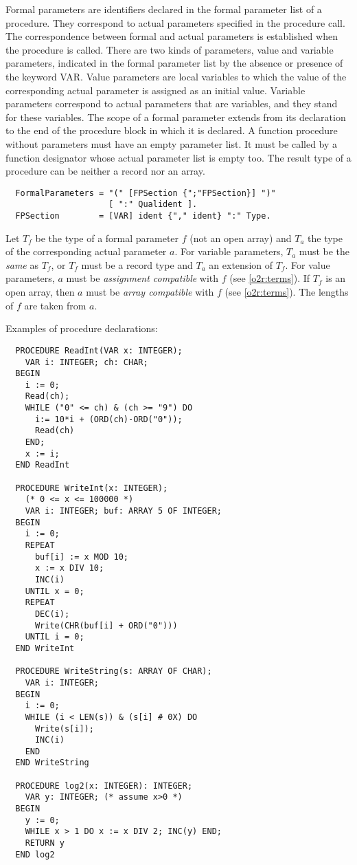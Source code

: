 Formal parameters are identifiers declared in the formal parameter
list of a procedure. They correspond to actual parameters specified
in the procedure call. The correspondence between formal and actual
parameters is established when the procedure is called. There are
two kinds of parameters, value and variable parameters, indicated
in the formal parameter list by the absence or presence of the keyword
VAR. Value parameters are local variables to which the value of the
corresponding actual parameter is assigned as an initial value. Variable
parameters correspond to actual parameters that are variables, and
they stand for these variables. The scope of a formal parameter extends
from its declaration to the end of the procedure block in which it
is declared. A function procedure without parameters must have an
empty parameter list. It must be called by a function designator whose
actual parameter list is empty too. The result type of a procedure
can be neither a record nor an array.
{\BNFsize
\begin{verbatim}
  FormalParameters = "(" [FPSection {";"FPSection}] ")"
                     [ ":" Qualident ].
  FPSection        = [VAR] ident {"," ident} ":" Type.
\end{verbatim}}
Let $T_f$ be the type of a formal parameter $f$ (not an open array) and
$T_a$ the type of the corresponding actual parameter $a$. For variable
parameters, $T_a$ must be the {\em same} as $T_f$,
or $T_f$ must be a record type
and $T_a$ an extension of $T_f$. For value parameters, $a$ must be
{\em assignment compatible} with $f$ (see \ref{o2r:terms}).
If $T_f$ is an open array, then $a$ must be {\em array compatible} with $f$
(see \ref{o2r:terms}). The lengths of $f$ are taken from $a$.

\noindent
Examples of procedure declarations:
\begin{verbatim}
  PROCEDURE ReadInt(VAR x: INTEGER);
    VAR i: INTEGER; ch: CHAR;
  BEGIN
    i := 0;
    Read(ch);
    WHILE ("0" <= ch) & (ch >= "9") DO
      i:= 10*i + (ORD(ch)-ORD("0"));
      Read(ch)
    END;
    x := i;
  END ReadInt

  PROCEDURE WriteInt(x: INTEGER);
    (* 0 <= x <= 100000 *)
    VAR i: INTEGER; buf: ARRAY 5 OF INTEGER;
  BEGIN
    i := 0;
    REPEAT
      buf[i] := x MOD 10;
      x := x DIV 10;
      INC(i)
    UNTIL x = 0;
    REPEAT
      DEC(i);
      Write(CHR(buf[i] + ORD("0")))
    UNTIL i = 0;
  END WriteInt

  PROCEDURE WriteString(s: ARRAY OF CHAR);
    VAR i: INTEGER;
  BEGIN
    i := 0;
    WHILE (i < LEN(s)) & (s[i] # 0X) DO
      Write(s[i]);
      INC(i)
    END
  END WriteString

  PROCEDURE log2(x: INTEGER): INTEGER;
    VAR y: INTEGER; (* assume x>0 *)
  BEGIN
    y := 0;
    WHILE x > 1 DO x := x DIV 2; INC(y) END;
    RETURN y
  END log2
\end{verbatim}


